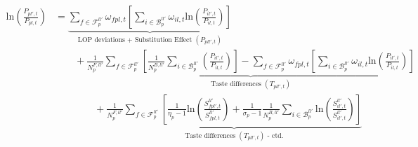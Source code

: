\begin{linenomath*}
    \begin{equation}\label{eq:cle_decomp2}
        \begin{aligned}
        \text{ln}\left(\frac{P_{pl',t}}{P_{pl,t}}\right)
            &=  \underbrace{
                \sum_{f \in \mathcal{F}^{ll'}_{p}} 
                    \omega_{fpl,t}
                    \left[
                        \sum_{i \in \mathcal{B}^{ll'}_{p}} 
                        \omega_{il,t}
                        \text{ln}
                        \left(
                            \frac{P_{il',t}}{P_{il,t}}
                        \right)
                    \right]
                }_{\text{LOP deviations + Substitution Effect } (P_{pll',t})} \\
                & \qquad + 
                \underbrace{
                    \frac{1}{N^{F,ll'}_{p}}
                    \sum_{f \in \mathcal{F}^{ll'}_{p}} 
                        \left[
                            \frac{1}{N^{B,ll'}_{p}}
                            \sum_{i \in \mathcal{B}^{ll'}_{p}} 
                            \left(
                                \frac{P_{il',t}}{P_{il,t}}
                            \right)
                        \right]
                    -
                    \sum_{f \in \mathcal{F}^{ll'}_{p}} 
                    \omega_{fpl,t}
                    \left[
                        \sum_{i \in \mathcal{B}^{ll'}_{p}} 
                        \omega_{il,t}
                        \text{ln}
                        \left(
                            \frac{P_{il',t}}{P_{il,t}}
                        \right)
                    \right]
                }_{\text{Taste differences } (T_{pll',t})} \\
                & \qquad \qquad + 
                \underbrace{
                    \frac{1}{N^{F,ll'}_{p}}
                    \sum_{f \in \mathcal{F}^{ll'}_{p}} 
                    \left[
                        \frac{1}{\eta_p-1}
                        \text{ln}
                        \left(
                            \frac{S^{ll'}_{fpl',t}}{S^{ll'}_{fpl,t}}
                        \right)
                        +
                        \frac{1}{\sigma_p-1}
                        \frac{1}{N^{B,ll'}_{p}}
                        \sum_{i \in \mathcal{B}^{ll'}_{p}} 
                            \text{ln}
                            \left(
                                \frac{S^{ll'}_{il',t}}{S^{ll'}_{il',t}}
                            \right)
                    \right]
                }_{\text{Taste differences } (T_{pll',t}) \text{ - ctd.}} \\

\end{aligned}
\end{equation}
\end{linenomath*}
